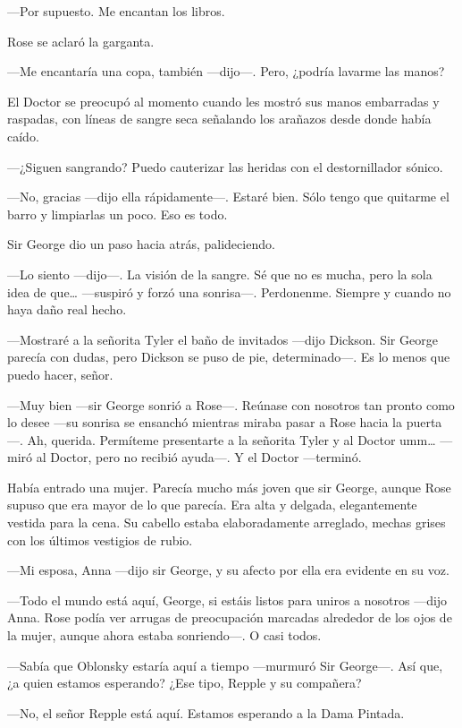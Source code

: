 {---Por supuesto. Me encantan los libros.}

{Rose se aclaró la garganta.}

{---Me encantaría una copa, también ---dijo---. Pero, ¿podría lavarme
las manos?}

{El Doctor se preocupó al momento cuando les mostró sus manos embarradas
y raspadas, con líneas de sangre seca señalando los arañazos desde donde
había caído.}

{---¿Siguen sangrando? Puedo cauterizar las heridas con el
destornillador sónico.}

{---No, gracias ---dijo ella rápidamente---. Estaré bien. Sólo tengo que
quitarme el barro y limpiarlas un poco. Eso es todo.}

{Sir George dio un paso hacia atrás, palideciendo.}

{---Lo siento ---dijo---. La visión de la sangre. Sé que no es mucha,
pero la sola idea de que\ldots{} ---suspiró y forzó una sonrisa---.
Perdonenme. Siempre y cuando no haya daño real hecho.}

{---Mostraré a la señorita Tyler el baño de invitados ---dijo Dickson.
Sir George parecía con dudas, pero Dickson se puso de pie,
determinado---. Es lo menos que puedo hacer, señor.}

{---Muy bien ---sir George sonrió a Rose---. Reúnase con nosotros tan
pronto como lo desee ---su sonrisa se ensanchó mientras miraba pasar a
Rose hacia la puerta---. Ah, querida. Permíteme presentarte a la
señorita Tyler y al Doctor umm\ldots{} ---miró al Doctor, pero no
recibió ayuda---. Y el Doctor ---terminó.}

{Había entrado una mujer. Parecía mucho más joven que sir George, aunque
Rose supuso que era mayor de lo que parecía. Era alta y delgada,
elegantemente vestida para la cena. Su cabello estaba elaboradamente
arreglado, mechas grises con los últimos vestigios de rubio.}

{---Mi esposa, Anna ---dijo sir George, y su afecto por ella era
evidente en su voz.}

{---Todo el mundo está aquí, George, si estáis listos para uniros a
nosotros ---dijo Anna. Rose podía ver arrugas de preocupación marcadas
alrededor de los ojos de la mujer, aunque ahora estaba sonriendo---. O
casi todos.}

{---Sabía que Oblonsky estaría aquí a tiempo ---murmuró Sir George---.
Así que, ¿a quien estamos esperando? ¿Ese tipo, Repple y su
compañera?}

{---No, el señor Repple está aquí. Estamos esperando a la Dama Pintada.}


